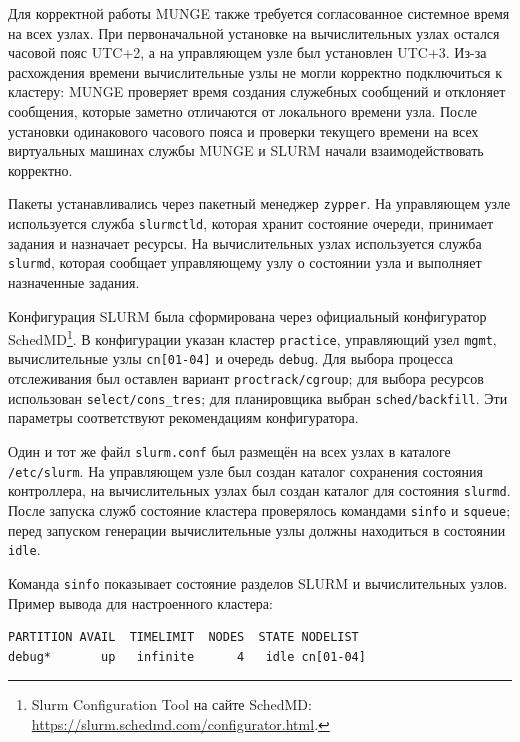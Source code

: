 Для корректной работы MUNGE также требуется согласованное системное время на всех узлах. При первоначальной установке на вычислительных узлах остался часовой пояс UTC+2, а на управляющем узле был установлен UTC+3. Из-за расхождения времени вычислительные узлы не могли корректно подключиться к кластеру: MUNGE проверяет время создания служебных сообщений и отклоняет сообщения, которые заметно отличаются от локального времени узла. После установки одинакового часового пояса и проверки текущего времени на всех виртуальных машинах службы MUNGE и SLURM начали взаимодействовать корректно.

Пакеты устанавливались через пакетный менеджер \texttt{zypper}. На управляющем узле используется служба \texttt{slurmctld}, которая хранит состояние очереди, принимает задания и назначает ресурсы. На вычислительных узлах используется служба \texttt{slurmd}, которая сообщает управляющему узлу о состоянии узла и выполняет назначенные задания.

Конфигурация SLURM была сформирована через официальный конфигуратор SchedMD\footnote{Slurm Configuration Tool на сайте SchedMD: \url{https://slurm.schedmd.com/configurator.html}.}. В конфигурации указан кластер \texttt{practice}, управляющий узел \texttt{mgmt}, вычислительные узлы \texttt{cn[01-04]} и очередь \texttt{debug}. Для выбора процесса отслеживания был оставлен вариант \texttt{proctrack/cgroup}; для выбора ресурсов использован \texttt{select/cons_tres}; для планировщика выбран \texttt{sched/backfill}. Эти параметры соответствуют рекомендациям конфигуратора.

Один и тот же файл \texttt{slurm.conf} был размещён на всех узлах в каталоге \texttt{/etc/slurm}. На управляющем узле был создан каталог сохранения состояния контроллера, на вычислительных узлах был создан каталог для состояния \texttt{slurmd}. После запуска служб состояние кластера проверялось командами \texttt{sinfo} и \texttt{squeue}; перед запуском генерации вычислительные узлы должны находиться в состоянии \texttt{idle}.

Команда \texttt{sinfo} показывает состояние разделов SLURM и вычислительных узлов. Пример вывода для настроенного кластера:

\begin{verbatim}
PARTITION AVAIL  TIMELIMIT  NODES  STATE NODELIST
debug*       up   infinite      4   idle cn[01-04]
\end{verbatim}

